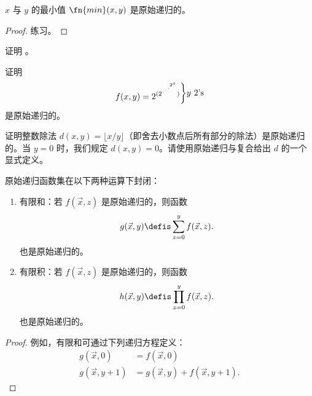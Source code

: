\documentclass[../../../include/open-logic-section]{subfiles}
\begin{document}
\begin{prop}
 $x$ 与 $y$ 的最小值 $\fn{min}(x,y)$ 是原始递归的。
\end{prop}

\begin{proof}
  练习。
\end{proof}

\begin{prob}
证明 。
\end{prob}

\begin{prob}
证明 \[
f(x, y) =
2^{(2^{\iddots^{2^{x}}})}\raisebox{1ex}{\bigg\rbrace}
\raisebox{1ex}{\text {$y$ $2$'s}}\] 是原始递归的。
\end{prob}

\begin{prob}
证明整数除法 $d(x, y) = \lfloor x/y \rfloor$（即舍去小数点后所有部分的除法）是原始递归的。当 $y = 0$ 时，我们规定 $d(x, y) = 0$。请使用原始递归与复合给出 $d$ 的一个显式定义。
\end{prob}

\begin{prop}
原始递归函数集在以下两种运算下封闭：
\begin{enumerate}
\item 有限和：若 $f(\vec x, z)$ 是原始递归的，则函数
\[
g(\vec x, y) \defis \sum_{z = 0}^y f(\vec x, z).
\]
也是原始递归的。
\item 有限积：若 $f(\vec x, z)$ 是原始递归的，则函数
\[
h(\vec x, y) \defis \prod_{z = 0}^y f(\vec x, z).
\]
也是原始递归的。
\end{enumerate}
\end{prop}

\begin{proof}
例如，有限和可通过下列递归方程定义：
\begin{align*}
  g(\vec x, 0) & = f(\vec x, 0)\\
  g(\vec x, y+1) & = g(\vec x, y) + f(\vec x, y+1).
\end{align*}
\end{proof}
\end{document}
